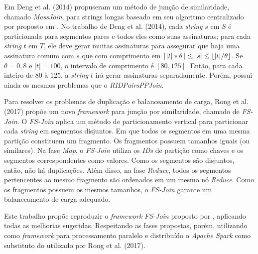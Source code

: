 Em Deng et al. (2014)\cite{Deng:2014} propuseram um método de junção de similaridade, chamado \textit{MassJoin}, para strings longas baseado em seu algoritmo centralizado por proposto em \cite{Li:2011}. No trabalho de Deng et al. (2014)\cite{Deng:2014}, cada \textit{string} \(s\) em \(S\) é particionada para segmentos pares e todos eles como suas assinaturas; para cada \textit{string} \(t\) em \(T\), ele deve gerar muitas assinaturas para assegurar que haja uma assinatura comum com $s$ que com comprimento em $\lceil|t|*\theta\rceil \leq |s| \leq \lfloor|t|/\theta\rfloor$. Se $\theta = 0,8$ e $| t | = 100$, o intervalo de comprimento é $[80,125]$. Então, para cada inteiro de \(80\) à \(125\), a \textit{string} $t$ irá gerar assinaturas separadamente. Porém, possui ainda os mesmos problemas que o \textit{RIDPairsPPJoin}.

Para resolver os problemas de duplicação e balanceamento de carga, Rong et al. (2017)\cite{Rong:2017:FS-Join} propõe um novo \textit{framework} para junção por similaridade, chamado de \textit{FS-Join}. O \textit{FS-Join} aplica um método de particionamento vertical para particionar cada \textit{string} em segmentos disjuntos. Em que todos os segmentos em uma mesma partição constituem um fragmento. Os fragmentos possuem tamanhos iguais (ou similares). Na fase \textit{Map}, o \textit{FS-Join} utiliza os \textit{IDs} de partição como chaves e os segmentos correspondentes como valores. Como os segmentos são disjuntos, então, não há duplicações. Além disso, na fase \textit{Reduce}, todos os segmentos pertencentes ao mesmo fragmento são ordenados em um mesmo nó \textit{Reduce}. Como os fragmentos possuem os mesmos tamanhos, o \textit{FS-Join} garante um balanceamento de carga adequado. 

Este trabalho propõe reproduzir o \textit{framework} \textit{FS-Join} proposto por \cite{Rong:2017:FS-Join}, aplicando todas as melhorias sugeridas. Respeitando as fases propostas, porém, utilizando como \textit{framework} para processamento paralelo e distribuído o \textit{Apache Spark} como substituto do utilizado por Rong et al. (2017)\cite{Rong:2017:FS-Join}.
